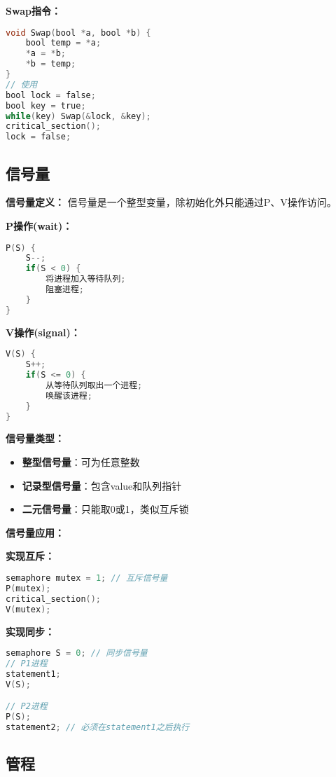 \documentclass[lang=cn,newtx,10pt,scheme=chinese]{../../elegantbook}
\begin{document}
\textbf{Swap指令：}
\begin{lstlisting}[language=C]
void Swap(bool *a, bool *b) {
    bool temp = *a;
    *a = *b;
    *b = temp;
}
// 使用
bool lock = false;
bool key = true;
while(key) Swap(&lock, &key);
critical_section();
lock = false;
\end{lstlisting}

\subsection{信号量}

\textbf{信号量定义：}
信号量是一个整型变量，除初始化外只能通过P、V操作访问。

\textbf{P操作(wait)：}
\begin{lstlisting}[language=C]
P(S) {
    S--;
    if(S < 0) {
        将进程加入等待队列;
        阻塞进程;
    }
}
\end{lstlisting}

\textbf{V操作(signal)：}
\begin{lstlisting}[language=C]
V(S) {
    S++;
    if(S <= 0) {
        从等待队列取出一个进程;
        唤醒该进程;
    }
}
\end{lstlisting}

\textbf{信号量类型：}
\begin{itemize}
  \item \textbf{整型信号量}：可为任意整数
  \item \textbf{记录型信号量}：包含value和队列指针
  \item \textbf{二元信号量}：只能取0或1，类似互斥锁
\end{itemize}

\textbf{信号量应用：}

\textbf{实现互斥：}
\begin{lstlisting}[language=C]
semaphore mutex = 1; // 互斥信号量
P(mutex);
critical_section();
V(mutex);
\end{lstlisting}

\textbf{实现同步：}
\begin{lstlisting}[language=C]
semaphore S = 0; // 同步信号量
// P1进程
statement1;
V(S);

// P2进程  
P(S);
statement2; // 必须在statement1之后执行
\end{lstlisting}

\subsection{管程}
\end{document}

